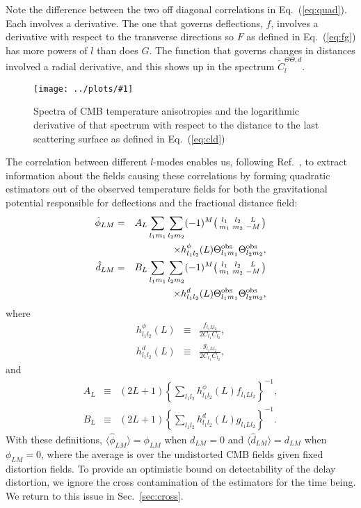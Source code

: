 \documentclass[prd,amsmath,amssymb,floatfix,superscriptaddress,nofootinbib,twocolumn]{revtex4-1}
\def\bea{\begin{eqnarray}}
\def\eea{\end{eqnarray}}
\newcommand{\ec}[1]{Eq.~(\ref{eq:#1})}
\newcommand{\eql}[1]{\label{eq:#1}}
\newcommand{\sfig}[2]{
\texttt{[image: ../plots/\#1]}
        }
\newcommand{\Sfig}[2]{
   \begin{figure}[thbp]
   \begin{center}
    \sfig{#1.pdf}{\columnwidth}
    \caption{{\small #2}}
    \label{fig:#1}
     \end{center}
   \end{figure}
}
\begin{document}
Note the difference between the two off diagonal correlations in \ec{quad}. Each involves a derivative. The one that governs deflections, $f$, involves a derivative with respect to the transverse directions so $F$ as defined in \ec{fg} has more powers of $l$ than does $G$. The function that governs changes in distances involved a radial derivative, and this shows up in the spectrum $\tilde{C}^{\Theta\Theta,d}_{l}$.


\Sfig{TT1}{Spectra of CMB temperature anisotropies and the logarithmic derivative of that spectrum with respect to the distance to the last scattering surface as defined in \ec{cld}
}



The correlation between different $l$-modes enables us, following Ref.~\cite{Okamoto:2003zw}, to extract information about the fields causing these correlations by forming quadratic estimators out of the observed temperature fields for both the gravitational potential responsible for deflections and the fractional distance field:
\bea
\hat \phi_{LM} &=& A_L 
\sum_{l_1m_1}\sum_{l_2m_2} 
 (-1)^M  \bigl(\begin{smallmatrix} l_1 & l_2 & L \\ m_1 & m_2 & -M  \end{smallmatrix}\bigr) 
 \nonumber \\  && \times 
 h^{\phi}_{l_1l_2}(L)  \tob_{l_1m_1} \tob_{l_2m_2}, \nonumber \\
\hat d_{LM} &=& B_{L} \sum_{l_1m_1}\sum_{l_2m_2}
(-1)^M  \bigl(\begin{smallmatrix} l_1 & l_2 & L \\ m_1 & m_2 & -M  \end{smallmatrix}\bigr) 
\nonumber \\ && \times
h^{d}_{l_1l_2}(L)  \tob_{l_1m_1} \tob_{l_2m_2}, \eql{distest}
\eea
where
\bea
h^{\phi}_{l_1l_2}(L)&\equiv& \frac{f_{l_1Ll_2}}{2C_{l_1}C_{l_2}} ,\nonumber\\
h^{d}_{l_1l_2}(L)&\equiv& \frac{g_{l_1Ll_2}}{2C_{l_1}C_{l_2}},\eql{defh}
\eea
and
\bea
A_L &\equiv& 
(2L+1)
 \left\{ \sum_{l_1l_2} h^{\phi}_{l_1l_2}(L)f_{l_1Ll_2}\right\}^{-1},\nonumber\\
B_L &\equiv& (2L+1) \left\{ \sum_{l_1l_2} h^{d}_{l_1l_2}(L)g_{l_1Ll_2}\right\}^{-1}.\eql{bt}
\eea 
With these definitions, 
$\langle \hat\phi_{LM} \rangle = \phi_{LM}$ when $d_{LM}=0$ and
$\langle \hat d _{LM} \rangle = d_{LM}$ when $\phi_{LM}=0$, where the average is over the undistorted CMB fields given fixed distortion fields.  To provide an optimistic bound
on detectability of the delay distortion, we ignore the cross contamination of the estimators for the time being. We return to this  issue in Sec.~\ref{sec:cross}.
\end{document}
